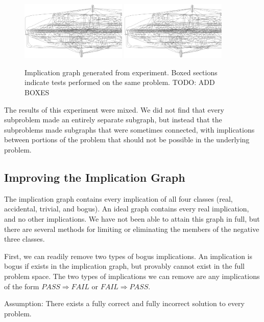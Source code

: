 \documentclass[11pt,twoside]{article}
\newcommand\fail{\mathit{FAIL}}
\newcommand\pass{\mathit{PASS}}
\theoremstyle{definition}
\begin{document}
\begin{figure}
\includegraphics[width=0.45\textwidth,bb=200 100 300 150,clip=true]{div.ps}
\includegraphics[width=0.45\textwidth,bb=300 150 500 350,clip=true]{div.ps}
\caption{Implication graph generated from experiment. Boxed sections indicate tests performed on the same problem. TODO: ADD BOXES}
\end{figure}




The results of this experiment were mixed. We did not find that every subproblem made an entirely separate subgraph, but instead that the subproblems made subgraphs that were sometimes connected, with implications between portions of the problem that should not be possible in the underlying problem.

\subsection{Improving the Implication Graph}

The implication graph contains every implication of all four classes (real, accidental, trivial, and bogus). An ideal graph contains every real implication, and no other implications. We have not been able to attain this graph in full, but there are several methods for limiting or eliminating the members of the negative three classes.

First, we can readily remove two types of bogus implications. An implication is bogus if exists in the implication graph, but provably cannot exist in the full problem space. The two types of implications we can remove are any implications of the form $\pass\Rightarrow\fail$ or $\fail\Rightarrow\pass$.

Assumption: There exists a fully correct and fully incorrect solution to every problem.
\end{document}

